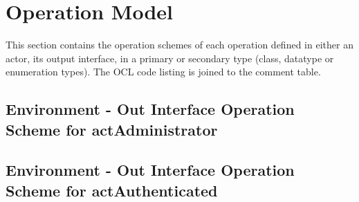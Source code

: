 \chapter{Operation Model}
\label{chap:lu.uni.lassy.excalibur.MyCrash.G02-OM}

This section contains the operation schemes of each operation defined in either an actor, its output interface, in a primary or secondary type (class, datatype or enumeration types). 
The \msrmessir OCL code listing is joined to the comment table.

\lstset{
float,
basicstyle=\scriptsize,
language=Messir,
breakatwhitespace=false,
tabsize=2,
breaklines=true,
numbers=left,
emptylines=1,
numbersep=5pt,
showspaces=false,
showstringspaces=false,
showtabs=false
} 



		
\section{Environment - Out Interface Operation Scheme for actAdministrator}
\label{OM-EM-OutInterface-OS-actAdministrator}









\section{Environment - Out Interface Operation Scheme for actAuthenticated}
\label{OM-EM-OutInterface-OS-actAuthenticated}




